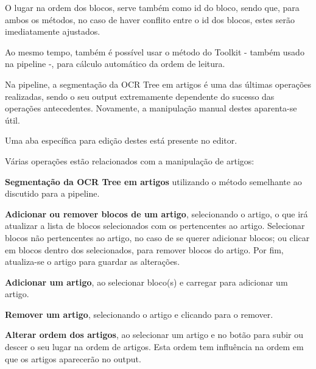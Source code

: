 
O lugar na ordem dos blocos, serve também como id do bloco, sendo que, para ambos os métodos, no caso de haver conflito entre o id dos blocos, estes serão imediatamente ajustados.


Ao mesmo tempo, também é possível usar o método do Toolkit - também usado na pipeline -, para cálculo automático da ordem de leitura.





Na pipeline, a segmentação da OCR Tree em artigos é uma das últimas operações realizadas, sendo o seu output extremamente dependente do sucesso das operações antecedentes. Novamente, a manipulação manual destes aparenta-se útil.

Uma aba específica para edição destes está presente no editor.

Várias operações estão relacionados com a manipulação de artigos:

\textbf{Segmentação da OCR Tree em artigos} utilizando o método semelhante ao discutido para a pipeline.


\textbf{Adicionar ou remover blocos de um artigo}, selecionando o artigo, o que irá atualizar a lista de blocos selecionados com os pertencentes ao artigo. Selecionar blocos não pertencentes ao artigo, no caso de se querer adicionar blocos; ou clicar em blocos dentro dos selecionados, para remover blocos do artigo. Por fim, atualiza-se o artigo para guardar as alterações.



\textbf{Adicionar um artigo}, ao selecionar bloco(s) e carregar para adicionar um artigo.


\textbf{Remover um artigo}, selecionando o artigo e clicando para o remover.


\textbf{Alterar ordem dos artigos}, ao selecionar um artigo e no botão para subir ou descer o seu lugar na ordem de artigos. Esta ordem tem influência na ordem em que os artigos aparecerão no output.

